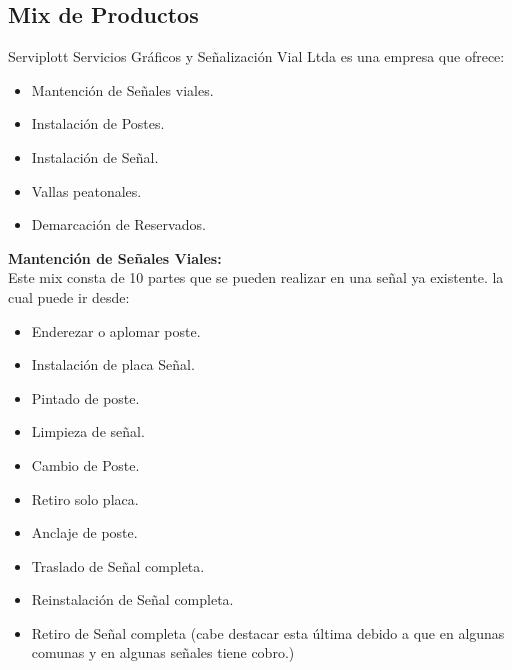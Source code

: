 	\subsection{Mix de Productos}
	Serviplott Servicios Gráficos y Señalización Vial Ltda es una empresa que ofrece:
	\begin{itemize}
	\item Mantención de Señales viales.
	\item Instalación de Postes.
	\item Instalación de Señal.
	\item Vallas peatonales. 
	\item Demarcación de Reservados. 
	\end{itemize}
	\textbf{Mantención de Señales Viales:} \\
\vspace{3mm} Este mix consta de 10 partes que se pueden realizar en una señal ya existente. la cual puede ir desde:
	\begin{itemize}
	\item Enderezar o aplomar poste. 
	\item Instalación de placa Señal. 
	\item Pintado de poste.
	\item Limpieza de señal.
	\item Cambio de Poste.
	\item Retiro solo placa.
	\item Anclaje de poste.
	\item Traslado de Señal completa.
	\item Reinstalación de Señal completa.
	\item Retiro de Señal completa (cabe destacar esta última debido a que en algunas 		comunas y en algunas señales tiene cobro.) 
	\end{itemize}
	
